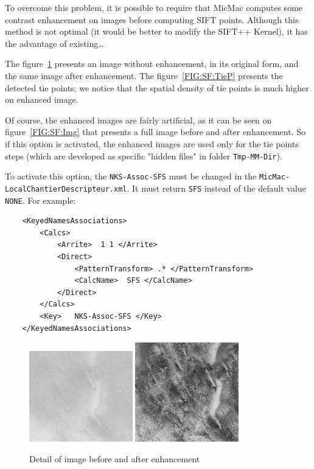 To overcome this problem, it is possible to require that MicMac computes some contrast enhancement on images before computing SIFT points. Although this method is not optimal (it would be better to modify the SIFT++ Kernel), it has the advantage of existing\dots



The figure~\ref{FIG:SF:Det} presents an image without enhancement, in its original form, and the same image after enhancement. The figure~\ref{FIG:SF:TieP} presents the detected tie points; we notice that the spatial density of tie points is much higher on enhanced image.

Of course, the enhanced images are fairly artificial, as it can be seen on figure~\ref{FIG:SF:Img} that presents a full image before and after enhancement. So if this option is activated, the enhanced images are used only for the tie points steps (which are developed as specific "hidden files" in folder {\tt Tmp-MM-Dir}).


To activate this option, the {\tt NKS-Assoc-SFS} must be changed in the {\tt MicMac-LocalChantierDescripteur.xml}. It must return {\tt SFS} instead of the default value {\tt NONE}. For example:

\begin{verbatim}
    <KeyedNamesAssociations>
        <Calcs>
            <Arrite>  1 1 </Arrite>
            <Direct>
                <PatternTransform> .* </PatternTransform>
                <CalcName>  SFS </CalcName>
            </Direct>
        </Calcs>
        <Key>   NKS-Assoc-SFS </Key>
    </KeyedNamesAssociations>
\end{verbatim}

\begin{figure}
\begin{center}
\includegraphics[width=0.4\textwidth]{FIGS/Tapioca-SFS/Detail-STD.jpg}
\includegraphics[width=0.4\textwidth]{FIGS/Tapioca-SFS/Detail-SFS.jpg}
\end{center}
\caption{Detail of image before and after enhancement}
\label{FIG:SF:Det}
\end{figure}


